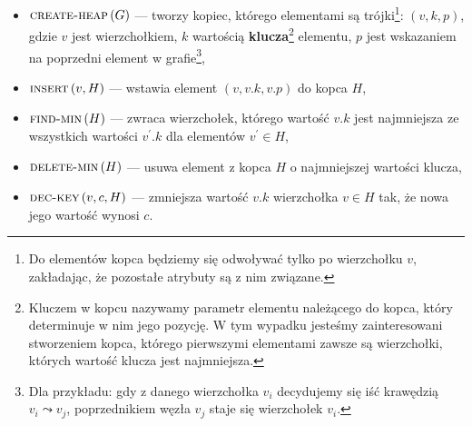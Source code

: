 \begin{itemize}
	\item $\textsc{create-heap} \left( G \right)$ --- tworzy kopiec, którego elementami są trójki\footnote{Do elementów kopca będziemy się odwoływać tylko po wierzchołku $v$, zakładając, że pozostałe atrybuty są z nim związane.}: $\left( v, k, p \right)$, gdzie $v$ jest wierzchołkiem, $k$ wartością \textbf{klucza}\footnote{Kluczem w kopcu nazywamy parametr elementu należącego do kopca, który determinuje w nim jego pozycję. W tym wypadku jesteśmy zainteresowani stworzeniem kopca, którego pierwszymi elementami zawsze są wierzchołki, których wartość klucza jest najmniejsza.} elementu, $p$ jest wskazaniem na poprzedni element w grafie\footnote{Dla przykładu: gdy z danego wierzchołka $v_{i}$ decydujemy się iść krawędzią $v_{i} \leadsto v_{j}$, poprzednikiem węzła $v_{j}$ staje się wierzchołek $v_{i}$.},
	\item $\textsc{insert} \left( v, H \right)$ --- wstawia element $\left( v, v.k, v.p \right)$ do kopca $H$,
	\item $\textsc{find-min} \left( H \right)$ --- zwraca wierzchołek, którego wartość $v.k$ jest najmniejsza ze wszystkich wartości $v^{\prime}.k$ dla elementów $v^{\prime} \in H$,
	\item $\textsc{delete-min} \left( H \right)$ --- usuwa element z kopca $H$ o najmniejszej wartości klucza,
	\item $\textsc{dec-key} \left( v, c, H \right)$ --- zmniejsza wartość $v.k$ wierzchołka $v \in H$ tak, że nowa jego wartość wynosi $c$.
\end{itemize}

